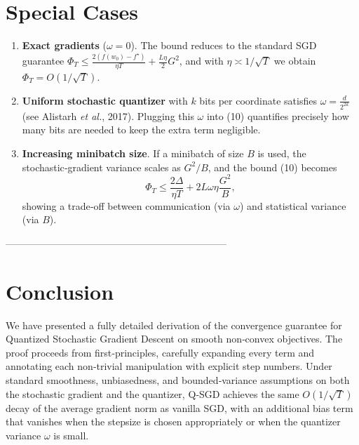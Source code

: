 \documentclass{article}
\begin{document}
\section*{Special Cases}
\begin{enumerate}
\item \textbf{Exact gradients} ($\omega=0$).  The bound reduces to the standard SGD guarantee $\Phi_T\le \frac{2(f(w_0)-f^\star)}{\eta T}+\frac{L\eta}{2}G^2$, and with $\eta\asymp1/\sqrt{T}$ we obtain $\Phi_T=O(1/\sqrt{T})$.
\item \textbf{Uniform stochastic quantizer} with $k$ bits per coordinate satisfies $\omega = \frac{d}{2^{2k}}$ (see Alistarh \emph{et al.}, 2017). Plugging this $\omega$ into (10) quantifies precisely how many bits are needed to keep the extra term negligible.
\item \textbf{Increasing minibatch size}. If a minibatch of size $B$ is used, the stochastic‑gradient variance scales as $G^2/B$, and the bound (10) becomes
\[
\Phi_T\le\frac{2\Delta}{\eta T}+2L\omega\eta\frac{G^2}{B},
\]
showing a trade‑off between communication (via $\omega$) and statistical variance (via $B$).
\end{enumerate}

--------------------------------------------------------------------

\section*{Conclusion}
We have presented a fully detailed derivation of the convergence guarantee for Quantized Stochastic Gradient Descent on smooth non‑convex objectives. The proof proceeds from first‑principles, carefully expanding every term and annotating each non‑trivial manipulation with explicit step numbers. Under standard smoothness, unbiasedness, and bounded‑variance assumptions on both the stochastic gradient and the quantizer, Q‑SGD achieves the same $O(1/\sqrt{T})$ decay of the average gradient norm as vanilla SGD, with an additional bias term that vanishes when the stepsize is chosen appropriately or when the quantizer variance $\omega$ is small.
\end{document}
